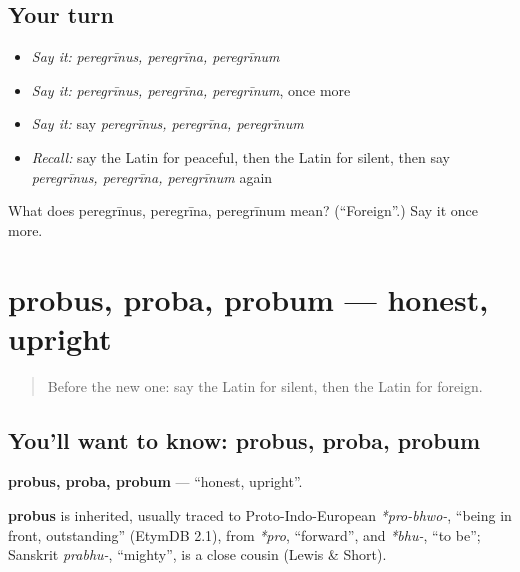 \subsection*{Your turn}
\begin{itemize}
\raggedright
  \item \emph{Say it:} \emph{peregrīnus, peregrīna, peregrīnum}
  \item \emph{Say it:} \emph{peregrīnus, peregrīna, peregrīnum}, once more
  \item \emph{Say it:} say \emph{peregrīnus, peregrīna, peregrīnum}
  \item \emph{Recall:} say the Latin for peaceful, then the Latin for silent, then say \emph{peregrīnus, peregrīna, peregrīnum} again
\end{itemize}

\begin{tcolorbox}[breakable,colback=teal!4,colframe=teal!35!black,title={Before you move on}]
What does peregrīnus, peregrīna, peregrīnum mean? (\textquotedblleft{}Foreign\textquotedblright{}.) Say it once more.
\end{tcolorbox}
\section[probus, proba, probum]{probus, proba, probum — honest, upright}

\label{lesson:LA-C213-probus}



\begin{quote}
Before the new one: say the Latin for silent, then the Latin for foreign.
\end{quote}

\subsection*{You'll want to know: probus, proba, probum}
\textbf{probus, proba, probum} — \textquotedblleft{}honest, upright\textquotedblright{}.

\begin{cousinweb}
\textbf{probus} is inherited, usually traced to Proto-Indo-European \emph{*pro-bhwo-}, \textquotedblleft{}being in front, outstanding\textquotedblright{} (EtymDB 2.1), from \emph{*pro}, \textquotedblleft{}forward\textquotedblright{}, and \emph{*bhu-}, \textquotedblleft{}to be\textquotedblright{}; Sanskrit \emph{prabhu-}, \textquotedblleft{}mighty\textquotedblright{}, is a close cousin (Lewis \& Short).
\end{cousinweb}

